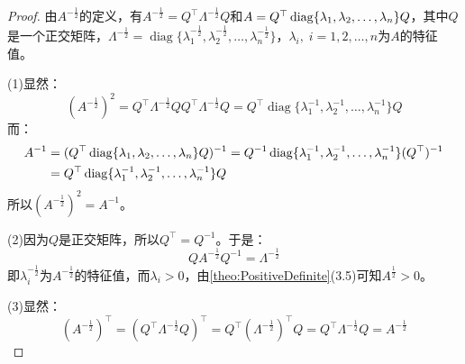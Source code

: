 \begin{proof}
	由$A^{-\frac{1}{2}}$的定义，有$A^{-\frac{1}{2}}=Q^{\top}\varLambda^{-\frac{1}{2}}Q$和$A=Q^{\top}\operatorname{diag}\{\lambda_1, \lambda_2, \dots, \lambda_{n}\}Q$，其中$Q$是一个正交矩阵，$\varLambda^{-\frac{1}{2}}=\operatorname{diag}\{\lambda_1^{-\frac{1}{2}},\lambda_2^{-\frac{1}{2}},\dots,\lambda_n^{-\frac{1}{2}}\}$，$\lambda_i,\;i=1,2,\dots,n$为$A$的特征值。\par
	(1)显然：
	\begin{equation*}
		(A^{-\frac{1}{2}})^2=Q^{\top}\varLambda^{-\frac{1}{2}}QQ^{\top}\varLambda^{-\frac{1}{2}}Q=Q^{\top}\operatorname{diag}\{\lambda_1^{-1},\lambda_2^{-1},\dots,\lambda_n^{-1}\}Q
	\end{equation*}
	而：
	\begin{align*}
		A^{-1}&=(Q^{\top}\operatorname{diag}\{\lambda_1, \lambda_2, \dots, \lambda_{n}\}Q)^{-1}=Q^{-1}\operatorname{diag}\{\lambda_1^{-1},\lambda_2^{-1},\dots,\lambda_n^{-1}\}(Q^{\top})^{-1} \\
		&=Q^{\top}\operatorname{diag}\{\lambda_1^{-1},\lambda_2^{-1},\dots,\lambda_n^{-1}\}Q
	\end{align*}
	所以$(A^{-\frac{1}{2}})^2=A^{-1}$。\par
	(2)因为$Q$是正交矩阵，所以$Q^{\top}=Q^{-1}$。于是：
	\begin{equation*}
		QA^{-\frac{1}{2}}Q^{-1}=\varLambda^{-\frac{1}{2}}
	\end{equation*}
	即$\lambda_i^{-\frac{1}{2}}$为$A^{-\frac{1}{2}}$的特征值，而$\lambda_i>0$，由\cref{theo:PositiveDefinite}(3.5)可知$A^{\frac{1}{2}}>0$。\par
	(3)显然：
	\begin{equation*}
		(A^{-\frac{1}{2}})^{\top}=(Q^{\top}\varLambda^{-\frac{1}{2}} Q)^{\top}=Q^{\top}(\varLambda^{-\frac{1}{2}})^{\top}Q=Q^{\top}\varLambda^{-\frac{1}{2}}Q=A^{-\frac{1}{2}}
	\end{equation*}
\end{proof}